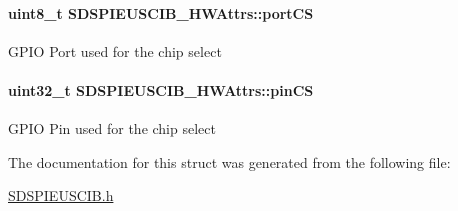 \paragraph[{port\-C\-S}]{\setlength{\rightskip}{0pt plus 5cm}uint8\-\_\-t S\-D\-S\-P\-I\-E\-U\-S\-C\-I\-B\-\_\-\-H\-W\-Attrs\-::port\-C\-S}\label{struct_s_d_s_p_i_e_u_s_c_i_b___h_w_attrs_ac7a742be07f6c2d4cd75f3c1e0cb62db}
G\-P\-I\-O Port used for the chip select 
\paragraph[{pin\-C\-S}]{\setlength{\rightskip}{0pt plus 5cm}uint32\-\_\-t S\-D\-S\-P\-I\-E\-U\-S\-C\-I\-B\-\_\-\-H\-W\-Attrs\-::pin\-C\-S}\label{struct_s_d_s_p_i_e_u_s_c_i_b___h_w_attrs_acbca6e53d49d2367d170d54add9ababd}
G\-P\-I\-O Pin used for the chip select 

The documentation for this struct was generated from the following file\-:\begin{DoxyCompactItemize}
\item 
\hyperlink{_s_d_s_p_i_e_u_s_c_i_b_8h}{S\-D\-S\-P\-I\-E\-U\-S\-C\-I\-B.\-h}\end{DoxyCompactItemize}
